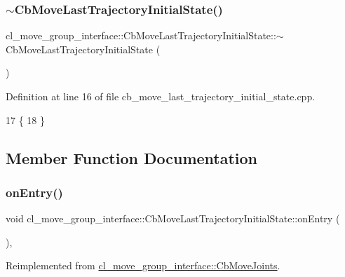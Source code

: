 \subsubsection{\texorpdfstring{$\sim$\+Cb\+Move\+Last\+Trajectory\+Initial\+State()}{~CbMoveLastTrajectoryInitialState()}}
{\footnotesize\ttfamily cl\+\_\+move\+\_\+group\+\_\+interface\+::\+Cb\+Move\+Last\+Trajectory\+Initial\+State\+::$\sim$\+Cb\+Move\+Last\+Trajectory\+Initial\+State (\begin{DoxyParamCaption}{ }\end{DoxyParamCaption})\hspace{0.3cm}{\ttfamily [virtual]}}



Definition at line 16 of file cb\+\_\+move\+\_\+last\+\_\+trajectory\+\_\+initial\+\_\+state.\+cpp.


\begin{DoxyCode}
17     \{
18     \}
\end{DoxyCode}


\subsection{Member Function Documentation}
\mbox{\label{classcl__move__group__interface_1_1CbMoveLastTrajectoryInitialState_ad51f4883ea1f7442875cda06c3d474c3}} 
\subsubsection{\texorpdfstring{on\+Entry()}{onEntry()}}
{\footnotesize\ttfamily void cl\+\_\+move\+\_\+group\+\_\+interface\+::\+Cb\+Move\+Last\+Trajectory\+Initial\+State\+::on\+Entry (\begin{DoxyParamCaption}{ }\end{DoxyParamCaption})\hspace{0.3cm}{\ttfamily [override]}, {\ttfamily [virtual]}}



Reimplemented from \hyperlink{classcl__move__group__interface_1_1CbMoveJoints_a23e4181af695aed9fa6bb4ae3f17fd76}{cl\+\_\+move\+\_\+group\+\_\+interface\+::\+Cb\+Move\+Joints}.



